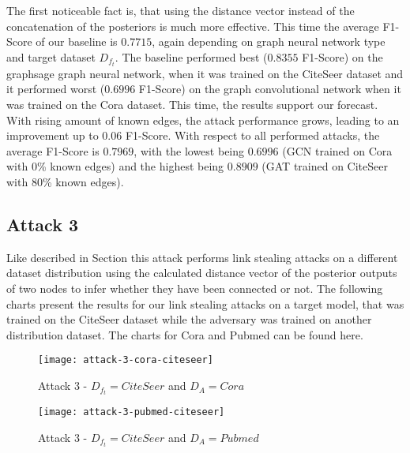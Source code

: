             The first noticeable fact is, that using the distance vector instead of the concatenation of the posteriors is much more effective.
            This time the average F1-Score of our baseline is $0.7715$, again depending on graph neural network type and target dataset $D_{f_t}$.
            The baseline performed best ($0.8355$ F1-Score) on the graphsage graph neural network, when it was trained on the  CiteSeer dataset and it performed worst ($0.6996$ F1-Score) on the graph convolutional network when it was trained on the Cora dataset.
            This time, the results support our forecast.
            With rising amount of known edges, the attack performance grows, leading to an improvement up to 0.06 F1-Score.
            With respect to all performed attacks, the average F1-Score is $0.7969$, with the lowest being $0.6996$ (GCN trained on Cora with 0\% known edges) and the highest being $0.8909$ (GAT trained on CiteSeer with 80\% known edges).

        \subsection*{Attack 3}
            Like described in Section  this attack performs link stealing attacks on a different dataset distribution using the calculated distance vector of the posterior outputs of two nodes to infer whether they have been connected or not. 
            The following charts present the results for our link stealing attacks on a target model, that was trained on the CiteSeer dataset while the adversary was trained on another distribution dataset.
            The charts for Cora and Pubmed can be found here. 

            \begin{figure}[h]
                \begin{center}
                    \texttt{[image: attack-3-cora-citeseer]}
                    \caption{Attack 3 - $D_{f_t} = CiteSeer$ and $D_A = Cora$}
                    \label{figure:eval-att3-citeseer-ora}
                \end{center}
            \end{figure}

            \begin{figure}[h]
                \begin{center}
                    \texttt{[image: attack-3-pubmed-citeseer]}
                    \caption{Attack 3 - $D_{f_t} = CiteSeer$ and $D_A = Pubmed$}
                    \label{figure:eval-att3-pubmed-cora}
                \end{center}
            \end{figure}
    
